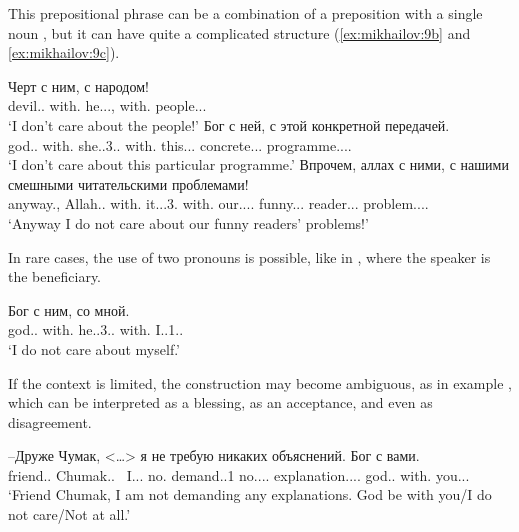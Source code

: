 \documentclass[output=paper]{langscibook}
\begin{document}
This prepositional phrase can be a combination of a preposition with a single noun , but it can have quite a complicated structure (\ref{ex:mikhailov:9b} and \ref{ex:mikhailov:9c}).


\ea\label{ex:mikhailov:9}
\ea \label{ex:mikhailov:9a}
\gll Черт с ним, с народом!\\
     devil.{\NOUN}.{\NOM} with.{\PREP} he.{\PRON}.{\INSTR}.{\SG}, with.{\PREP} people.{\PRON}.{\INSTR}.{\SG}\\
\glt `I don’t care about the people!'
\ex \label{ex:mikhailov:9b}
\gll Бог с ней, с этой конкретной передачей.\\
     god.{\NOUN}.{\NOM} with.{\PREP} she.{\PRON}.3{\F}.{\INSTR}.{\SG} with.{\PREP} this.{\PRON}.{\INSTR}.{\SG} concrete.{\ADJ}.{\INSTR}.{\SG} programme.{\NOUN}.{\F}.{\INSTR}.{\SG}\\
\glt `I don’t care about this particular programme.'
\ex \label{ex:mikhailov:9c}
\gll Впрочем, аллах с ними, с нашими смешными читательскими проблемами!\\
     anyway.{\ADV}, Allah.{\NOUN}.{\NOM} with.{\PREP} it.{\PRON}.{\INSTR}.3.{\PL} with.{\PREP} our.{\PRON}.{\POSS}.{\INSTR}.{\PL} funny.{\ADJ}.{\INSTR}.{\PL} reader.{\ADJ}.{\INSTR}.{\PL} problem.{\NOUN}.{\F}.{\INSTR}.{\PL}\\
\glt `Anyway I do not care about our funny readers’ problems!'
\z
\z

In rare cases, the use of two pronouns is possible, like in , where the speaker is the beneficiary.

\ea \label{ex:mikhailov:10}
\gll Бог с ним, со мной.\\
     god.{\NOUN}.{\NOM} with.{\PREP} he.{\PRON}.3{\glossM}.{\INSTR}.{\SG} with.{\PREP} I.{\PRON}.1.{\INSTR}.{\SG}\\
\glt `I do not care about myself.'
\z

If the context is limited, the construction may become ambiguous, as in example , which can be interpreted as a blessing, as an acceptance, and even as disagreement.


\ea \label{ex:mikhailov:11}
\gll –Друже Чумак,     <…> я не требую никаких объяснений. Бог с вами.\\
    friend.{\NOUN}.{\VOC} Chumak.{\NOUNPROPER}.{\NOM}  ~I.{\PRON}.{\NOM}.{\SG} no.{\PTCP} demand.{\PRES}.1{\SG} no.{\PRON}.{\NEG}.{\GEN}.{\PL} explanation.{\NOUN}.{\GEN}.{\PL}. god.{\NOUN}.{\NOM} with.{\PREP} you.{\PRON}.{\INSTR}.{\PL}\\
\glt `Friend Chumak, I am not demanding any explanations. God be with you\slash I do not care\slash Not at all.'
\z
\end{document}
